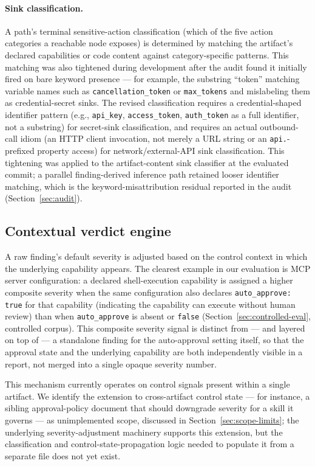 \documentclass[sigconf,anonymous,review]{acmart}
\begin{document}
\paragraph{Sink classification.} A path's terminal sensitive-action classification (which of the five action categories a reachable node exposes) is determined by matching the artifact's declared capabilities or code content against category-specific patterns. This matching was also tightened during development after the audit found it initially fired on bare keyword presence --- for example, the substring ``token'' matching variable names such as \texttt{cancellation\_token} or \texttt{max\_tokens} and mislabeling them as credential-secret sinks. The revised classification requires a credential-shaped identifier pattern (e.g., \texttt{api\_key}, \texttt{access\_token}, \texttt{auth\_token} as a full identifier, not a substring) for secret-sink classification, and requires an actual outbound-call idiom (an HTTP client invocation, not merely a URL string or an \texttt{api.}-prefixed property access) for network/external-API sink classification. This tightening was applied to the artifact-content sink classifier at the evaluated commit; a parallel finding-derived inference path retained looser identifier matching, which is the keyword-misattribution residual reported in the audit (Section~\ref{sec:audit}).

\subsection{Contextual verdict engine}
\label{sec:verdict}
A raw finding's default severity is adjusted based on the control context in which the underlying capability appears. The clearest example in our evaluation is MCP server configuration: a declared shell-execution capability is assigned a higher composite severity when the same configuration also declares \texttt{auto\_approve: true} for that capability (indicating the capability can execute without human review) than when \texttt{auto\_approve} is absent or \texttt{false} (Section~\ref{sec:controlled-eval}, controlled corpus). This composite severity signal is distinct from --- and layered on top of --- a standalone finding for the auto-approval setting itself, so that the approval state and the underlying capability are both independently visible in a report, not merged into a single opaque severity number.

This mechanism currently operates on control signals present within a single artifact. We identify the extension to cross-artifact control state --- for instance, a sibling approval-policy document that should downgrade severity for a skill it governs --- as unimplemented scope, discussed in Section~\ref{sec:scope-limits}; the underlying severity-adjustment machinery supports this extension, but the classification and control-state-propagation logic needed to populate it from a separate file does not yet exist.
\end{document}
